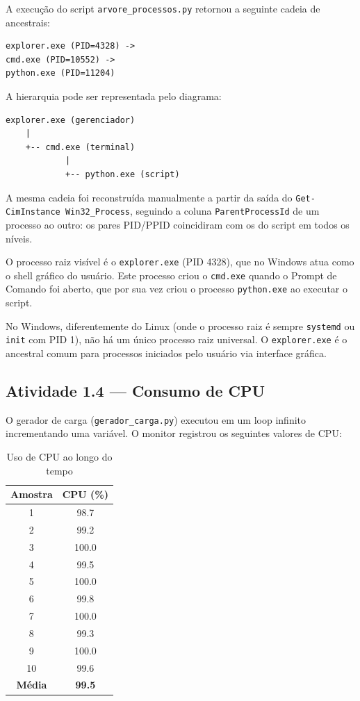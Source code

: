 \documentclass[12pt,a4paper]{article}
\begin{document}
A execução do script \texttt{arvore\_processos.py} retornou a seguinte cadeia de ancestrais:

\begin{lstlisting}[caption={Cadeia de processos}]
explorer.exe (PID=4328) ->
cmd.exe (PID=10552) ->
python.exe (PID=11204)
\end{lstlisting}

A hierarquia pode ser representada pelo diagrama:

\begin{verbatim}
explorer.exe (gerenciador)
    |
    +-- cmd.exe (terminal)
            |
            +-- python.exe (script)
\end{verbatim}

A mesma cadeia foi reconstruída manualmente a partir da saída do \texttt{Get-CimInstance Win32\_Process}, seguindo a coluna \texttt{ParentProcessId} de um processo ao outro: os pares PID/PPID coincidiram com os do script em todos os níveis.

O processo raiz visível é o \texttt{explorer.exe} (PID 4328), que no Windows atua como o shell gráfico do usuário. Este processo criou o \texttt{cmd.exe} quando o Prompt de Comando foi aberto, que por sua vez criou o processo \texttt{python.exe} ao executar o script.

No Windows, diferentemente do Linux (onde o processo raiz é sempre \texttt{systemd} ou \texttt{init} com PID 1), não há um único processo raiz universal. O \texttt{explorer.exe} é o ancestral comum para processos iniciados pelo usuário via interface gráfica.

\subsection{Atividade 1.4 — Consumo de CPU}

O gerador de carga (\texttt{gerador\_carga.py}) executou em um loop infinito incrementando uma variável. O monitor registrou os seguintes valores de CPU:

\begin{table}[H]
\centering
\caption{Uso de CPU ao longo do tempo}
\label{tab:cpu}
\begin{tabular}{@{}cc@{}}
\toprule
\textbf{Amostra} & \textbf{CPU (\%)} \\ \midrule
1 & 98.7 \\
2 & 99.2 \\
3 & 100.0 \\
4 & 99.5 \\
5 & 100.0 \\
6 & 99.8 \\
7 & 100.0 \\
8 & 99.3 \\
9 & 100.0 \\
10 & 99.6 \\ \midrule
\textbf{Média} & \textbf{99.5} \\ \bottomrule
\end{tabular}
\end{table}
\end{document}
